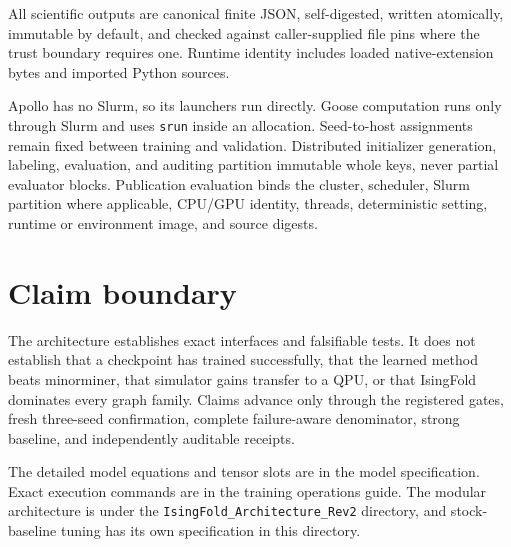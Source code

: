 \documentclass[
  american,
  10pt,
  a4paper,
]{article}
\begin{document}
All scientific outputs are canonical finite JSON, self-digested, written
atomically, immutable by default, and checked against caller-supplied
file pins where the trust boundary requires one. Runtime identity
includes loaded native-extension bytes and imported Python sources.

Apollo has no Slurm, so its launchers run directly. Goose computation
runs only through Slurm and uses \texttt{srun} inside an allocation.
Seed-to-host assignments remain fixed between training and validation.
Distributed initializer generation, labeling, evaluation, and auditing
partition immutable whole keys, never partial evaluator blocks.
Publication evaluation binds the cluster, scheduler, Slurm partition
where applicable, CPU/GPU identity, threads, deterministic setting,
runtime or environment image, and source digests.

\section{Claim boundary}\label{claim-boundary}

The architecture establishes exact interfaces and falsifiable tests. It
does not establish that a checkpoint has trained successfully, that the
learned method beats minorminer, that simulator gains transfer to a QPU,
or that IsingFold dominates every graph family. Claims advance only
through the registered gates, fresh three-seed confirmation, complete
failure-aware denominator, strong baseline, and independently auditable
receipts.

The detailed model equations and tensor slots are in the model
specification. Exact execution commands are in the training operations
guide. The modular architecture is under the
\texttt{IsingFold\_Architecture\_Rev2} directory, and stock-baseline
tuning has its own specification in this directory.
\end{document}
